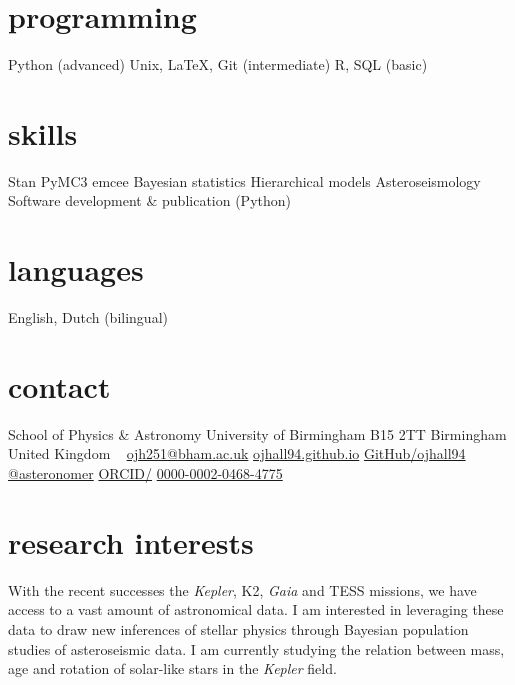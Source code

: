 \documentclass[]{k-cv} %
\begin{document}


\begin{aside} %
\section{programming}
Python (advanced)
Unix, LaTeX, Git (intermediate)
R, SQL (basic)
\section{skills}
Stan
PyMC3
emcee 
Bayesian statistics
Hierarchical models
Asteroseismology
Software development \& publication (Python)
\section{languages}
English, Dutch (bilingual)
\section{contact}
School of Physics \& Astronomy
University of Birmingham
B15 2TT
Birmingham
United Kingdom
~
\href{mailto:ojh251@student.bham.ac.uk}{ojh251@bham.ac.uk}
\href{http://www.ojhall94.github.io}{ojhall94.github.io}
\href{http://www.github.com/ojhall94}{GitHub/ojhall94}
\href{http://www.twitter.com/asteronomer}{@asteronomer}
\href{http://www.orcid.com/0000-0002-0468-4775}{ORCID/}
\href{http://www.orcid.com/0000-0002-0468-4775}{0000-0002-0468-4775}
\end{aside}

\section{research interests}
\bodyfont With the recent successes the \textit{Kepler}, K2, \textit{Gaia} and TESS missions, we have access to a vast amount of astronomical data. I am interested in leveraging these data to draw new inferences of stellar physics through Bayesian population studies of asteroseismic data. I am currently studying the relation between mass, age and rotation of solar-like stars in the \textit{Kepler} field.
\end{document}
